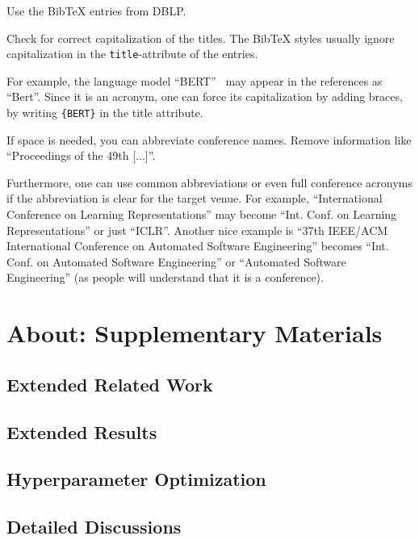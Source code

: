 \documentclass[manuscript, nonacm]{acmart}
\begin{document}
Use the BibTeX entries from DBLP.

Check for correct capitalization of the titles.
The BibTeX styles usually ignore capitalization in the \texttt{title}-attribute of the entries.

For example, the language model ``BERT''~\cite{devlin} may appear in the references as ``Bert''.
Since it is an acronym, one can force its capitalization by adding braces, \ie by writing \texttt{\{BERT\}} in the title attribute.

If space is needed, you can abbreviate conference names. 
Remove information like ``Proceedings of the 49th [...]''.

Furthermore, one can use common abbreviations or even full conference acronyms if the abbreviation is clear for the target venue.
For example, ``International Conference on Learning Representations'' may become ``Int. Conf. on Learning Representations'' or just ``ICLR''. 
%
Another nice example is ``37th IEEE/ACM International Conference on Automated Software Engineering'' becomes ``Int. Conf. on Automated Software Engineering'' or ``Automated Software Engineering'' (as people will understand that it is a conference).



\section{About: Supplementary Materials}


\subsection{Extended Related Work}
\label{appendix:extendedrelatedwork}

\subsection{Extended Results}
\label{appendix:extendedresults}

\subsection{Hyperparameter Optimization}
\label{appendix:hyperparameteroptimization}

\subsection{Detailed Discussions}
\label{appendix:detaileddiscussion}
\end{document}
